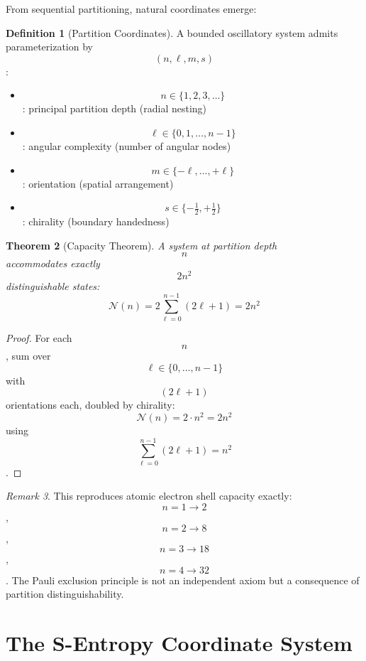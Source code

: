 \documentclass[11pt,twocolumn,a4paper]{article}
\newtheorem{theorem}{Theorem}[section]
\theoremstyle{definition}
\newtheorem{definition}[theorem]{Definition}
\theoremstyle{remark}
\newtheorem{remark}[theorem]{Remark}
\begin{document}
From sequential partitioning, natural coordinates emerge:

\begin{definition}[Partition Coordinates]
\label{def:partition_coords}
A bounded oscillatory system admits parameterization by $$(n, \ell, m, s)$$:
\begin{itemize}
    \item $$n \in \{1, 2, 3, \ldots\}$$: principal partition depth (radial nesting)
    \item $$\ell \in \{0, 1, \ldots, n-1\}$$: angular complexity (number of angular nodes)
    \item $$m \in \{-\ell, \ldots, +\ell\}$$: orientation (spatial arrangement)
    \item $$s \in \{-\tfrac{1}{2}, +\tfrac{1}{2}\}$$: chirality (boundary handedness)
\end{itemize}
\end{definition}

\begin{theorem}[Capacity Theorem]
\label{thm:capacity}
A system at partition depth $$n$$ accommodates exactly $$2n^2$$ distinguishable states:
\begin{equation}
\mathcal{N}(n) = 2\sum_{\ell=0}^{n-1}(2\ell+1) = 2n^2
\end{equation}
\end{theorem}

\begin{proof}
For each $$n$$, sum over $$\ell \in \{0, \ldots, n-1\}$$ with $$(2\ell+1)$$ orientations each, doubled by chirality:
\begin{equation}
\mathcal{N}(n) = 2 \cdot n^2 = 2n^2
\end{equation}
using $$\sum_{\ell=0}^{n-1}(2\ell+1) = n^2$$.
\end{proof}

\begin{remark}
This reproduces atomic electron shell capacity exactly: $$n=1 \to 2$$, $$n=2 \to 8$$, $$n=3 \to 18$$, $$n=4 \to 32$$. The Pauli exclusion principle is not an independent axiom but a consequence of partition distinguishability.
\end{remark}

\section{The S-Entropy Coordinate System}
\label{sec:coordinates}
\end{document}
